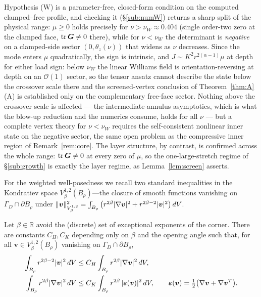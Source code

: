 \begin{remark}
    \label{rem:Wstatus}
    Hypothesis (W) is a parameter-free, closed-form condition on the computed clamped--free profile, and checking it
    (\S\ref{sub:numW}) returns a sharp split of the physical range: $\mu\ge0$ holds precisely for
    $\nu>\nu_W\approx0.404$ (single order-two zero at the clamped face, $\operatorname{tr}\bm G\neq0$ there), while for $\nu<\nu_W$
    the determinant is \emph{negative} on a clamped-side sector $(0,\theta_z(\nu))$ that widens as $\nu$ decreases.
    Since the mode enters $\mu$ quadratically, the sign is intrinsic, and $J\sim K^2r^{2(\alpha-1)}\mu$ at depth for
    either load sign: below $\nu_W$ the linear Williams field is orientation-reversing at depth on an $\mathcal O(1)$
    sector, so the tensor ansatz cannot describe the state below the crossover scale there and the screened-vertex
    conclusion of Theorem~\ref{thm:A}(A) is established only on the complementary free-face sector. Nothing above the
    crossover scale is affected --- the intermediate-annulus asymptotics, which is what the blow-up reduction and the
    numerics consume, holds for all $\nu$ --- but a complete vertex theory for $\nu<\nu_W$ requires the
    self-consistent nonlinear inner state on the negative sector, the same open problem as the compressive inner
    region of Remark~\ref{rem:core}. The layer structure, by contrast, is confirmed across the whole range:
    $\operatorname{tr}\bm G\neq0$ at every zero of $\mu$, so the one-large-stretch regime of \S\ref{sub:growth} is exactly the
    layer regime, as Lemma~\ref{lem:screen} asserts.
\end{remark}

For the weighted well-posedness we recall two standard inequalities in the Kondratiev space
$V^{1,2}_\beta(B_\rho)$---the closure of smooth functions vanishing on $\Gamma_D\cap\partial B_\rho$ under
$\|\bm{v}\|_{V^{1,2}_\beta}^2 = \int_{B_\rho} \big(r^{2\beta}|\nabla\bm{v}|^2 + r^{2\beta-2}|\bm{v}|^2\big)\,dV$.

\begin{lemma}
    \label{lem:korn}
    Let $\beta\in\mathbb{R}$ avoid the (discrete) set of exceptional exponents of the corner. There are constants
    $C_H, C_K$ depending only on $\beta$ and the opening angle such that, for all $\bm{v}\in V^{1,2}_\beta(B_\rho)$
    vanishing on $\Gamma_D\cap\partial B_\rho$,
    \begin{align}
        \label{eq:hardy}
        \int_{B_\rho} r^{2\beta-2}|\bm{v}|^2\,dV    & \le C_H \int_{B_\rho} r^{2\beta}|\nabla\bm{v}|^2\,dV,                \\
        \label{eq:korn}
        \int_{B_\rho} r^{2\beta}|\nabla\bm{v}|^2\,dV & \le C_K \int_{B_\rho} r^{2\beta}\,|\bm{\varepsilon}(\bm{v})|^2\,dV,
        \qquad \bm{\varepsilon}(\bm{v}) = \tfrac12\big(\nabla\bm{v}+\nabla\bm{v}^T\big).
    \end{align}
\end{lemma}

